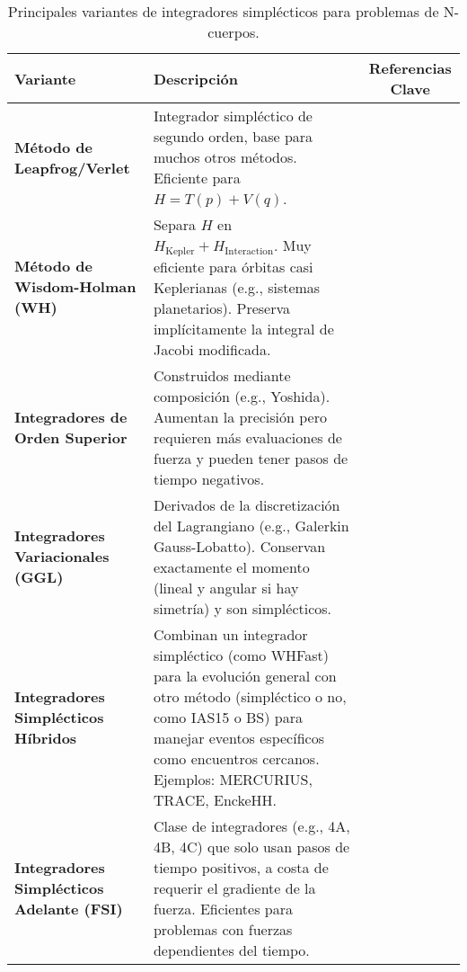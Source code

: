 \begin{table}[htbp] %
    \centering %
    \caption{Principales variantes de integradores simplécticos para problemas de N-cuerpos.}%
    \label{tab:integrator_variants} %
    \begin{adjustbox}{max width=\textwidth} %
        \begin{tabular}{ >{\bfseries}l | p{} | c }
            \toprule
            Variante & Descripción & Referencias Clave \\
            \midrule
            Método de Leapfrog/Verlet & Integrador simpléctico de segundo orden, base para muchos otros métodos. Eficiente para \(H = T(p) + V(q)\). &~\cite{stuchi2002, farr2007, Hernandez2015} \\
            \midrule
            Método de Wisdom-Holman (WH) & Separa \(H\) en \(H_{\text{Kepler}} + H_{\text{Interaction}}\). Muy eficiente para órbitas casi Keplerianas (e.g., sistemas planetarios). Preserva implícitamente la integral de Jacobi modificada. &~\cite{wisdom1991, yoshida1990, rebound_doc} \\
            \midrule
            Integradores de Orden Superior & Construidos mediante composición (e.g., Yoshida). Aumentan la precisión pero requieren más evaluaciones de fuerza y pueden tener pasos de tiempo negativos. &~\cite{farr2007, yoshida1993, yoshida1990} \\
            \midrule
            Integradores Variacionales (GGL) & Derivados de la discretización del Lagrangiano (e.g., Galerkin Gauss-Lobatto). Conservan exactamente el momento (lineal y angular si hay simetría) y son simplécticos. &~\cite{farr2007, Hernandez2015} \\
            \midrule
            Integradores Simplécticos Híbridos & Combinan un integrador simpléctico (como WHFast) para la evolución general con otro método (simpléctico o no, como IAS15 o BS) para manejar eventos específicos como encuentros cercanos. Ejemplos: MERCURIUS, TRACE, EnckeHH.\ &~\cite{hernandez2020, rebound_doc, hernandez2019b, rein2019} \\
            \midrule
            Integradores Simplécticos Adelante (FSI) & Clase de integradores (e.g., 4A, 4B, 4C) que solo usan pasos de tiempo positivos, a costa de requerir el gradiente de la fuerza. Eficientes para problemas con fuerzas dependientes del tiempo. &~\cite{chin2005} \\

\end{tabular}
\end{adjustbox}
\end{table}

